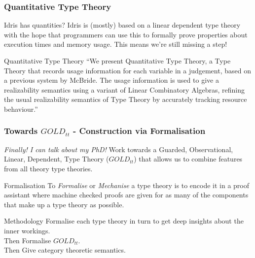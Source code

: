 \documentclass
  [hyperref={colorlinks = true,linkcolor = blue, 
             citecolor = blue, urlcolor = blue}
  ]{beamer}
\begin{document}
\begin{frame}[fragile]
  \frametitle{Quantitative Type Theory}
  \begin{block}{Idris has quantities?}
  Idris is (mostly) based on a linear dependent type theory
  with the hope that programmers can use this to formally
  prove properties about execution times and memory usage.
  This means we're still missing a step!
  \end{block}

  \begin{block}{Quantitative Type Theory \citep{atkey2018syntax}}
  ``We present Quantitative Type Theory, a Type Theory that
  records usage information for each variable in a judgement,
  based on a previous system by McBride. The usage information is
  used to give a realizability semantics using a variant of
  Linear Combinatory Algebras, refining the usual realizability
  semantics of Type Theory by accurately tracking resource
  behaviour.''
  \end{block}
\end{frame}


\begin{frame}[fragile]
  \frametitle{Towards $GOLD_{tt}$ - Construction via Formalisation}
  \begin{block}{\textit{Finally! I can talk about my PhD!}}
  Work towards a Guarded, Observational, Linear, Dependent, Type
  Theory ($GOLD_{tt}$) that allows us to combine features from
  all theory type theories.
  \end{block}
  \begin{block}{Formalisation}
  To \textit{Formalise} or \textit{Mechanise} a type theory
  is to encode it in a proof assistant where machine checked
  proofs are given for as many of the components that make
  up a type theory as possible.
  \end{block}
  \begin{block}{Methodology}
  Formalise each type theory in turn to get deep insights about
  the inner workings. \\
  Then Formalise $GOLD_{tt}$. \\
  Then Give category theoretic semantics.
  \end{block}
\end{frame}
\end{document}
